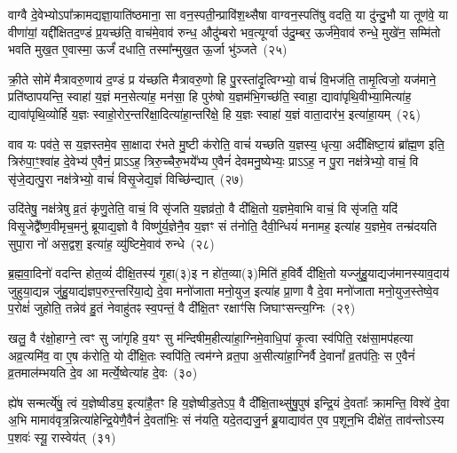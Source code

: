 वाग्वै दे॒वेभ्यो\-ऽपा᳚क्रामद्यज्ञा॒याति॑ष्ठमाना॒ सा वन॒स्पती॒न्प्रावि॑श॒थ्सैषा वाग्वन॒स्पति॑षु वदति॒ या दु॑न्दु॒भौ या तूण॑वे॒ या वीणा॑यां॒ यद्दी᳚क्षितद॒ण्डं प्र॒यच्छ॑ति॒ वाच॑मे॒वाव॑ रुन्ध॒ औदु॑म्बरो भव॒त्यूर्ग्वा उ॑दु॒म्बर॒ ऊर्ज॑मे॒वाव॑ रुन्धे॒ मुखे॑न॒ सम्मि॑तो भवति मुख॒त ए॒वास्मा॒ ऊर्जं॑ दधाति॒ तस्मा᳚न्मुख॒त ऊ॒र्जा भु॑ञ्जते~(२५)

क्री॒ते सोमे॑ मैत्रावरु॒णाय॑ द॒ण्डं प्र य॑च्छति मैत्रावरु॒णो हि पु॒रस्ता॑दृ॒त्विग्भ्यो॒ वाचं॑ वि॒भज॑ति॒ तामृ॒त्विजो॒ यज॑माने॒ प्रति॑\-ष्ठापयन्ति॒ स्वाहा॑ य॒ज्ञं मन॒सेत्या॑ह॒ मन॑सा॒ हि पुरु॑षो य॒ज्ञम॑भि॒गच्छ॑ति॒ स्वाहा॒ द्यावा॑\-पृथि॒वीभ्या॒मित्या॑ह॒ द्यावा॑पृथि॒व्योर्\mbox{}हि य॒ज्ञः स्वाहो॒रोर॒न्तरि॑क्षा॒दित्या॑हा॒न्तरि॑क्षे॒ हि य॒ज्ञः स्वाहा॑ य॒ज्ञं वाता॒दार॑भ॒ इत्या॑हा॒यम्~(२६)

वाव यः पव॑ते॒ स य॒ज्ञस्तमे॒व सा॒क्षादा र॑भते मु॒ष्टी क॑रोति॒ वाचं॑ यच्छति य॒ज्ञस्य॒ धृत्या॒ अदी᳚क्षिष्टा॒यं ब्रा᳚ह्म॒ण इति॒ त्रिरु॑पा॒ꣳ॒श्वा॑ह दे॒वेभ्य॑ ए॒वैनं॒ प्रा\-ऽऽ\-ह॒ त्रिरु॒च्चैरु॒भये᳚भ्य ए॒वैनं॑ देवमनु॒ष्येभ्यः॒ प्रा\-ऽऽ\-ह॒ न पु॒रा नक्ष॑त्रेभ्यो॒ वाचं॒ वि सृ॑जे॒द्यत्पु॒रा नक्ष॑त्रेभ्यो॒ वाचं॑ विसृ॒जेद्य॒ज्ञं विच्छि॑न्द्यात्~(२७)

उदि॑तेषु॒ नक्ष॑त्रेषु व्र॒तं कृ॑णु॒तेति॒ वाचं॒ वि सृ॑जति य॒ज्ञव्र॑तो॒ वै दी᳚क्षि॒तो य॒ज्ञमे॒वाभि वाचं॒ वि सृ॑जति॒ यदि॑ विसृ॒जेद्वै᳚ष्ण॒वीमृच॒मनु॑ ब्रूयाद्य॒ज्ञो वै विष्णु॑र्य॒ज्ञेनै॒व य॒ज्ञꣳ सं त॑नोति॒ दैवी॒न्धियं॑ मनामह॒ इत्या॑ह य॒ज्ञमे॒व तन्म्र॑दयति सुपा॒रा नो॑ अस॒द्वश॒ इत्या॑ह॒ व्यु॑ष्टिमे॒वाव॑ रुन्धे~(२८)

ब्र॒ह्म॒वा॒दिनो॑ वदन्ति होत॒व्यं॑ दीक्षि॒तस्य॑ गृ॒हा(३)इ न हो॑त॒व्या(३)मिति॑ ह॒विर्वै दी᳚क्षि॒तो यज्जु॑हु॒याद्यज॑मानस्याव॒दाय॑ जुहुया॒द्यन्न जु॑हु॒याद्य॑ज्ञप॒रुर॒न्तरि॑या॒द्ये दे॒वा मनो॑जाता मनो॒युज॒ इत्या॑ह प्रा॒णा वै दे॒वा मनो॑जाता मनो॒युज॒स्तेष्वे॒व प॒रोक्षं॑ जुहोति॒ तन्नेव॑ हु॒तं नेवाहु॑तꣴ स्व॒पन्तं॒ वै दी᳚क्षि॒तꣳ रक्षाꣳ॑सि जिघाꣳसन्त्य॒ग्निः~(२९)

खलु॒ वै र॑क्षो॒हाग्ने॒ त्वꣳ सु जा॑गृहि व॒यꣳ सु म॑न्दिषीम॒हीत्या॑हा॒ग्निमे॒वाधि॒पां कृ॒त्वा स्व॑पिति॒ रक्ष॑सा॒मप॑हत्या अव्र॒त्यमि॑व॒ वा ए॒ष क॑रोति॒ यो दी᳚क्षि॒तः स्वपि॑ति॒ त्वम॑ग्ने व्रत॒पा अ॒सीत्या॑हा॒ग्निर्वै दे॒वानां᳚ व्र॒तप॑तिः॒ स ए॒वैनं॑ व्र॒तमाल॑म्भयति दे॒व आ मर्त्ये॒ष्वेत्या॑ह दे॒वः~(३०)

ह्ये॑ष सन्मर्त्ये॑षु॒ त्वं य॒ज्ञेष्वीड्य॒ इत्या॑है॒तꣳ हि य॒ज्ञेष्वीड॒ते\-ऽप॒ वै दी᳚क्षि॒ताथ्सु॑षु॒पुष॑ इन्द्रि॒यं दे॒वताः᳚ क्रामन्ति॒ विश्वे॑ दे॒वा अ॒भि मामाव॑वृत्र॒न्नित्या॑हेन्द्रि॒येणै॒वैनं॑ दे॒वता॑भिः॒ सं न॑यति॒ यदे॒तद्यजु॒र्न ब्रू॒याद्याव॑त ए॒व प॒शून॒भि दीक्षे॑त॒ ताव॑न्तो\-ऽस्य प॒शवः॑ स्यू॒ रास्वेय॑त्~(३१)

